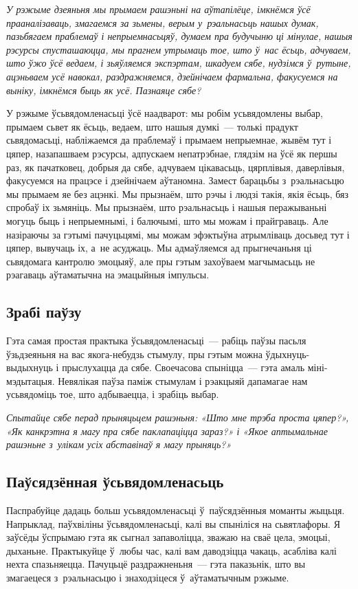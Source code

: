 \emph{У рэжыме дзеяньня мы прымаем рашэньні на аўтапілёце, імкнёмся ўсё прааналізаваць, змагаемся за зьмены, верым у~рэальнасьць нашых думак, пазьбягаем праблемаў і непрыемнасьцяў, думаем пра будучыню ці мінулае, нашыя рэсурсы спусташаюцца, мы прагнем утрымаць тое, што ў~нас ёсьць, адчуваем, што ўжо ўсё ведаем, і зьяўляемся экспэртам, шкадуем сябе, нудзімся ў~рутыне, ацэньваем усё навокал, раздражняемся, дзейнічаем фармальна, факусуемся на выніку, імкнёмся быць як усё. Пазнаяце сябе?}

У рэжыме ўсьвядомленасьці ўсё наадварот: мы робім усьвядомлены выбар, прымаем сьвет як ёсьць, ведаем, што нашыя думкі~--- толькі прадукт сьвядомасьці, набліжаемся да праблемаў і прымаем непрыемнае, жывём тут і цяпер, назапашваем рэсурсы, адпускаем непатрэбнае, глядзім на ўсё як першы раз, як пачатковец, добрыя да сябе, адчуваем цікавасьць, цярплівыя, даверлівыя, факусуемся на працэсе і дзейнічаем аўтаномна. Замест барацьбы з~рэальнасьцю мы прымаем яе без ацэнкі. Мы прызнаём, што рэчы і людзі такія, якія ёсьць, бяз спробаў іх зьмяніць. Мы прызнаём, што рэальнасьць і нашыя перажываньні могуць быць і непрыемнымі, і балючымі, што мы можам і прайграваць. Але назіраючы за гэтымі пачуцьцямі, мы можам эфэктыўна атрымліваць досьвед тут і цяпер, вывучаць іх, а~не асуджаць. Мы адмаўляемся ад прыгнечаньня ці сьвядомага кантролю эмоцыяў, але пры гэтым захоўваем магчымасьць не рэагаваць аўтаматычна на эмацыйныя імпульсы.

\subsection*{Зрабі паўзу}

Гэта самая простая практыка ўсьвядомленасьці~--- рабіць паўзы пасьля ўзьдзеяньня на вас якога-небудзь стымулу, пры гэтым можна ўдыхнуць-выдыхнуць і прыслухацца да сябе. Своечасова спыніцца~--- гэта амаль міні-мэдытацыя. Невялікая паўза паміж стымулам і рэакцыяй дапамагае нам усьвядоміць тое, што адбываецца, і зрабіць выбар.

\emph{Спытайце сябе перад прыняцьцем рашэньня: «Што мне трэба проста цяпер?», «Як канкрэтна я магу пра сябе паклапаціцца зараз?» і «Якое аптымальнае рашэньне з~улікам усіх абставінаў я магу прыняць?»}

\subsection*{Паўсядзённая ўсьвядомленасьць}

Паспрабуйце дадаць больш усьвядомленасьці ў~паўсядзённыя моманты жыцьця. Напрыклад, паўхвіліны ўсьвядомленасьці, калі вы спыніліся на сьвятлафоры. Я заўсёды ўспрымаю гэта як сыгнал запаволіцца, зважаю на сваё цела, эмоцыі, дыханьне. Практыкуйце ў~любы час, калі вам даводзіцца чакаць, асабліва калі нехта спазьняецца. Пачуцьцё раздражненьня~--- гэта паказьнік, што вы змагаецеся з~рэальнасьцю і знаходзіцеся ў~аўтаматычным рэжыме.

